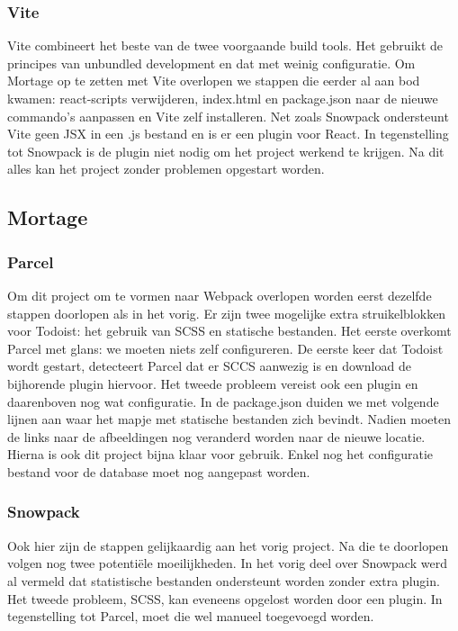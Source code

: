 \subsubsection{Vite}
Vite combineert het beste van de twee voorgaande build tools. Het gebruikt de principes van unbundled development en dat met weinig configuratie. Om Mortage op te zetten met Vite overlopen we stappen die eerder al aan bod kwamen: react-scripts verwijderen, index.html en package.json naar de nieuwe commando’s aanpassen en Vite zelf installeren. Net zoals Snowpack ondersteunt Vite geen JSX in een .js bestand en is er een plugin voor React. In tegenstelling tot Snowpack is de plugin niet nodig om het project werkend te krijgen. Na dit alles kan het project zonder problemen opgestart worden. 

\subsection{Mortage}

\subsubsection{Parcel}
Om dit project om te vormen naar Webpack overlopen worden eerst dezelfde stappen doorlopen als in het vorig. Er zijn twee mogelijke extra struikelblokken voor Todoist: het gebruik van SCSS en statische bestanden. Het eerste overkomt Parcel met glans: we moeten niets zelf configureren. De eerste keer dat Todoist wordt gestart, detecteert Parcel dat er SCCS aanwezig is en download de bijhorende plugin hiervoor. Het tweede probleem vereist ook een plugin en daarenboven nog wat configuratie. In de package.json duiden we met volgende lijnen aan waar het mapje met statische bestanden zich bevindt. Nadien moeten de links naar de afbeeldingen nog veranderd worden naar de nieuwe locatie. Hierna is ook dit project bijna klaar voor gebruik. Enkel nog het configuratie bestand voor de database moet nog aangepast worden.

\subsubsection{Snowpack}
Ook hier zijn de stappen gelijkaardig aan het vorig project. Na die te doorlopen volgen nog twee potentiële moeilijkheden. In het vorig deel over Snowpack werd al vermeld dat statistische bestanden ondersteunt worden zonder extra plugin. Het tweede probleem, SCSS, kan eveneens opgelost worden door een plugin. In tegenstelling tot Parcel, moet die wel manueel toegevoegd worden. 

